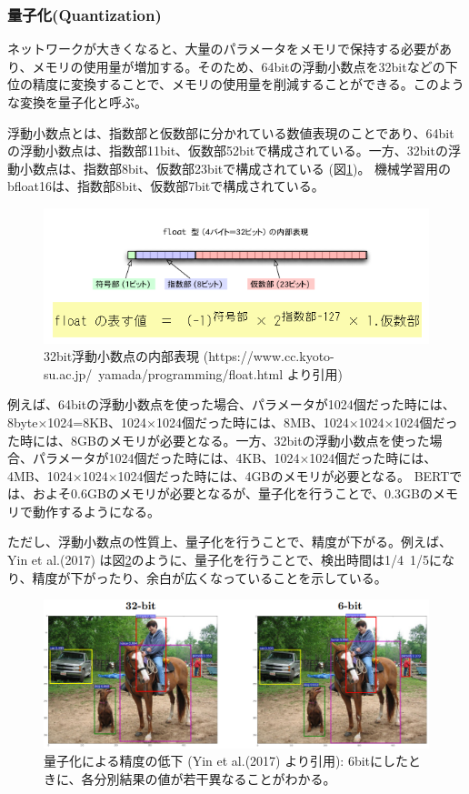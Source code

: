 \documentclass{ltjsarticle}
\begin{document}
\subsubsection{量子化(Quantization)}
ネットワークが大きくなると、大量のパラメータをメモリで保持する必要があり、メモリの使用量が増加する。そのため、64bitの浮動小数点を32bitなどの下位の精度に変換することで、メモリの使用量を削減することができる。このような変換を量子化と呼ぶ。
\par
浮動小数点とは、指数部と仮数部に分かれている数値表現のことであり、64bitの浮動小数点は、指数部11bit、仮数部52bitで構成されている。一方、32bitの浮動小数点は、指数部8bit、仮数部23bitで構成されている (図\ref{fig:float32})。
機械学習用のbfloat16は、指数部8bit、仮数部7bitで構成されている。
\begin{figure}[htbp]
  \centering
  \includegraphics[width=15cm]{./capture/float32.png}
  \caption{32bit浮動小数点の内部表現 (https://www.cc.kyoto-su.ac.jp/~yamada/programming/float.html より引用)}
  \label{fig:float32}
\end{figure}

\par
例えば、64bitの浮動小数点を使った場合、パラメータが1024個だった時には、8byte×1024=8KB、1024×1024個だった時には、8MB、1024×1024×1024個だった時には、8GBのメモリが必要となる。一方、32bitの浮動小数点を使った場合、パラメータが1024個だった時には、4KB、1024×1024個だった時には、4MB、1024×1024×1024個だった時には、4GBのメモリが必要となる。
BERTでは、およそ0.6GBのメモリが必要となるが、量子化を行うことで、0.3GBのメモリで動作するようになる。
\par
ただし、浮動小数点の性質上、量子化を行うことで、精度が下がる。例えば、Yin et al.(2017) は図\ref{fig:32bitVS6bit}のように、量子化を行うことで、検出時間は1/4~1/5になり、精度が下がったり、余白が広くなっていることを示している。 
\begin{figure}[htbp]
  \centering
  \includegraphics[width=15cm]{./capture/32bitVS6bit.png}
  \caption{量子化による精度の低下 (Yin et al.(2017) より引用): 6bitにしたときに、各分別結果の値が若干異なることがわかる。}
  \label{fig:32bitVS6bit}
\end{figure}
\end{document}
